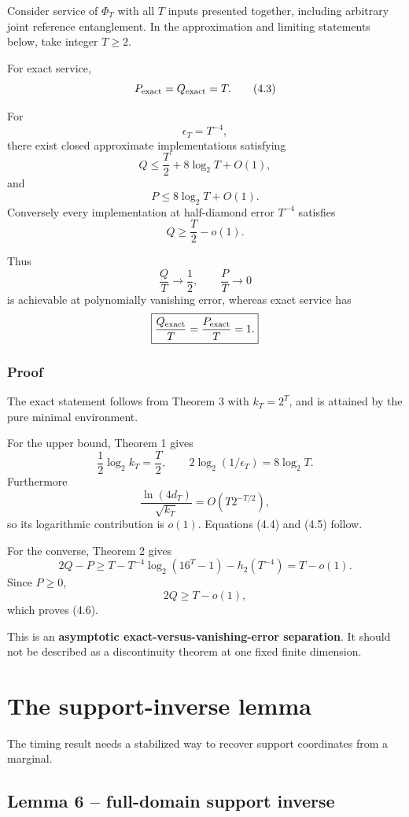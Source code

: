 \documentclass[11pt,a4paper]{article}
\numberwithin{equation}{section}
\begin{document}
Consider service of \(\Phi_T\) with all \(T\) inputs presented together,
including arbitrary joint reference entanglement. In the approximation
and limiting statements below, take integer \(T\ge2\).

For exact service, \[
P_{\rm exact}=Q_{\rm exact}=T.
\tag{4.3}
\]

For \[
\epsilon_T=T^{-4},
\] there exist closed approximate implementations satisfying \[
Q
\le
\frac T2+8\log_2T+O(1),
\tag{4.4}
\] and \[
P
\le
8\log_2T+O(1).
\tag{4.5}
\] Conversely every implementation at half-diamond error \(T^{-4}\)
satisfies \[
Q\ge\frac T2-o(1).
\tag{4.6}
\]

Thus \[
\boxed{
\frac QT\to\frac12,\qquad
\frac PT\to0
}
\] is achievable at polynomially vanishing error, whereas exact service
has \[
\boxed{
\frac{Q_{\rm exact}}T
=
\frac{P_{\rm exact}}T
=1.
}
\]

\subsubsection{Proof}\label{proof-4}

The exact statement follows from Theorem 3 with \(k_T=2^T\), and is
attained by the pure minimal environment.

For the upper bound, Theorem 1 gives \[
\frac12\log_2k_T=\frac T2,
\qquad
2\log_2(1/\epsilon_T)=8\log_2T.
\] Furthermore \[
\frac{\ln(4d_T)}{\sqrt{k_T}}
=
O(T2^{-T/2}),
\] so its logarithmic contribution is \(o(1)\). Equations (4.4) and
(4.5) follow.

For the converse, Theorem 2 gives \[
2Q-P
\ge
T
-
T^{-4}\log_2(16^T-1)
-h_2(T^{-4})
=
T-o(1).
\] Since \(P\ge0\), \[
2Q\ge T-o(1),
\] which proves (4.6).

This is an \textbf{asymptotic exact-versus-vanishing-error separation}.
It should not be described as a discontinuity theorem at one fixed
finite dimension.

\section{The support-inverse lemma}\label{the-support-inverse-lemma}

The timing result needs a stabilized way to recover support coordinates
from a marginal.

\subsection*{Lemma 6 -- full-domain support
inverse}\label{lemma-6-full-domain-support-inverse}
\end{document}
